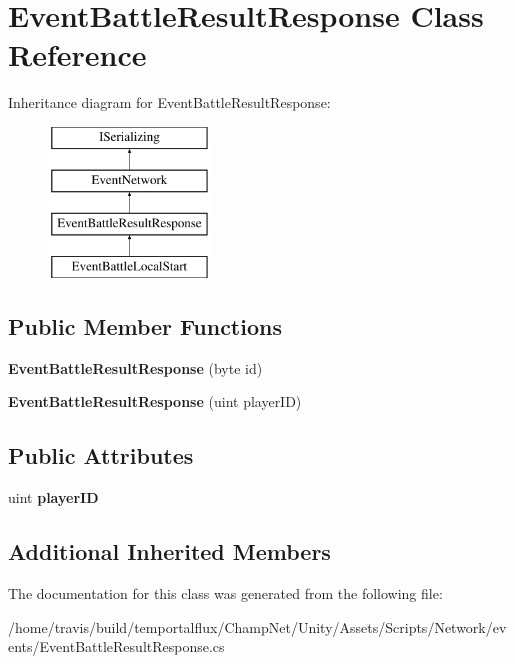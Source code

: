 \hypertarget{class_event_battle_result_response}{\section{Event\-Battle\-Result\-Response Class Reference}
\label{class_event_battle_result_response}
}
Inheritance diagram for Event\-Battle\-Result\-Response\-:\begin{figure}[H]
\begin{center}
\leavevmode
\includegraphics[height=4.000000cm]{class_event_battle_result_response}
\end{center}
\end{figure}
\subsection*{Public Member Functions}
\begin{DoxyCompactItemize}
\item 
\hypertarget{class_event_battle_result_response_add0797e1a302bac9347a13fb24364520}{{\bfseries Event\-Battle\-Result\-Response} (byte id)}\label{class_event_battle_result_response_add0797e1a302bac9347a13fb24364520}

\item 
\hypertarget{class_event_battle_result_response_ac38a0dcea1fabeb95b49ae02ff7e5874}{{\bfseries Event\-Battle\-Result\-Response} (uint player\-I\-D)}\label{class_event_battle_result_response_ac38a0dcea1fabeb95b49ae02ff7e5874}

\end{DoxyCompactItemize}
\subsection*{Public Attributes}
\begin{DoxyCompactItemize}
\item 
\hypertarget{class_event_battle_result_response_ada6f86b445a765ab55896a2f97a688bb}{uint {\bfseries player\-I\-D}}\label{class_event_battle_result_response_ada6f86b445a765ab55896a2f97a688bb}

\end{DoxyCompactItemize}
\subsection*{Additional Inherited Members}


The documentation for this class was generated from the following file\-:\begin{DoxyCompactItemize}
\item 
/home/travis/build/temportalflux/\-Champ\-Net/\-Unity/\-Assets/\-Scripts/\-Network/events/Event\-Battle\-Result\-Response.\-cs\end{DoxyCompactItemize}
